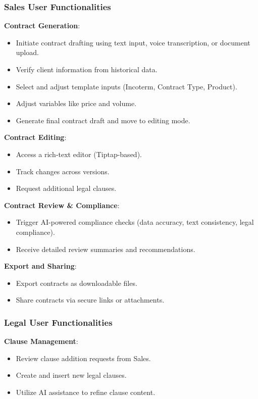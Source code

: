 \subsubsection{Sales User Functionalities}
\textbf{Contract Generation}:
\begin{itemize}
    \item Initiate contract drafting using text input, voice transcription, or document upload.
    \item Verify client information from historical data.
    \item Select and adjust template inputs (Incoterm, Contract Type, Product).
    \item Adjust variables like price and volume.
    \item Generate final contract draft and move to editing mode.
\end{itemize}

\textbf{Contract Editing}:
\begin{itemize}
    \item Access a rich-text editor (Tiptap-based).
    \item Track changes across versions.
    \item Request additional legal clauses.
\end{itemize}
    
\textbf{Contract Review \& Compliance}:
\begin{itemize}
    \item Trigger AI-powered compliance checks (data accuracy, text consistency, legal compliance).
    \item Receive detailed review summaries and recommendations.
\end{itemize}

\textbf{Export and Sharing}:
\begin{itemize}
    \item Export contracts as downloadable files.
    \item Share contracts via secure links or attachments.
\end{itemize}

\subsubsection{Legal User Functionalities}
\textbf{Clause Management}:
\begin{itemize}
    \item Review clause addition requests from Sales.
    \item Create and insert new legal clauses.
    \item Utilize AI assistance to refine clause content.
\end{itemize}

